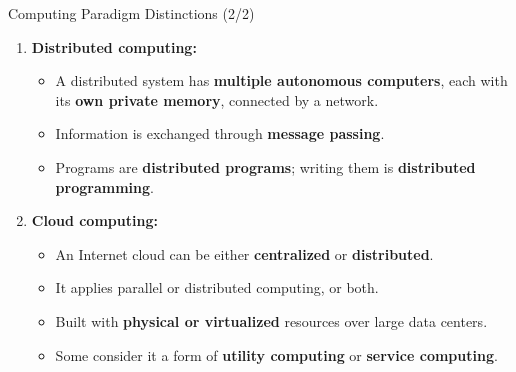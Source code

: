 \begin{frame}{Computing Paradigm Distinctions (2/2)}
\begin{enumerate}
\item<1-> \textbf{Distributed computing:}
    \begin{itemize}
    \item A distributed system has \textbf{multiple autonomous computers}, each with its \textbf{own private memory}, connected by a network.
    \item Information is exchanged through \textbf{message passing}.
    \item Programs are \textbf{distributed programs}; writing them is \textbf{distributed programming}.
    \end{itemize}
\item<2-> \textbf{Cloud computing:}
    \begin{itemize}
    \item An Internet cloud can be either \textbf{centralized} or \textbf{distributed}.
    \item It applies parallel or distributed computing, or both.
    \item Built with \textbf{physical or virtualized} resources over large data centers.
    \item Some consider it a form of \textbf{utility computing} or \textbf{service computing}.
    \end{itemize}
\end{enumerate}
\end{frame}

